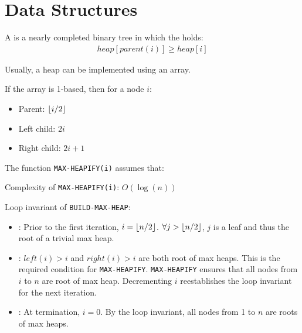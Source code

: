 \chapter{Data Structures}

    \par A  is a nearly completed binary tree in which the
       holds:
      \begin{align*}
        heap[parent(i)] \geq heap[i]
      \end{align*}
    \par Usually, a heap can be implemented using an array.
    \par If the array is 1-based, then for a node $i$:
    \begin{itemize}
      \item Parent: $\lfloor i / 2\rfloor$
      \item Left child: $2i$
      \item Right child: $2i + 1$
    \end{itemize}
    \par The function \texttt{MAX-HEAPIFY(i)} assumes that: 
    \par Complexity of \texttt{MAX-HEAPIFY(i)}: $O(\log(n))$
    \begin{algorithm}
      \begin{algorithmic}[1]
        \ENDFUNCTION
      \end{algorithmic}
    \end{algorithm}
    \begin{algorithm}
      \begin{algorithmic}[1]
          \ENDFOR
        \ENDPROCEDURE
      \end{algorithmic}
    \end{algorithm}
    \par Loop invariant of \texttt{BUILD-MAX-HEAP}:
    \begin{itemize}
      \item {}: Prior to the first iteration,
        $i = \lfloor n/2\rfloor$. $\forall j > \lfloor n/2\rfloor$, $j$ is a leaf and thus
        the root of a trivial max heap.
      \item {}: $left(i) > i$ and $right(i) > i$ are both root
        of max heaps. This is the required condition for \texttt{MAX-HEAPIFY}.
        \texttt{MAX-HEAPIFY} ensures that all nodes from $i$ to $n$ are root
        of max heap. Decrementing $i$ reestablishes the loop invariant for the
        next iteration.
      \item {}: At termination, $i = 0$. By the loop invariant,
        all nodes from 1 to $n$ are roots of max heaps.
    \end{itemize}

